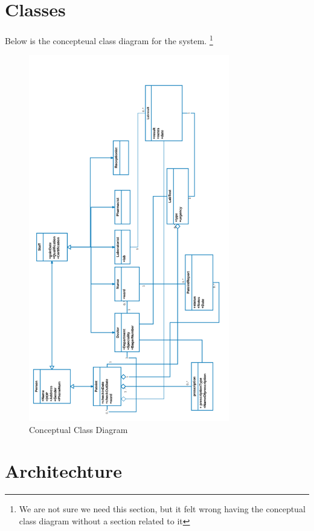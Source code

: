 \documentclass[14pt]{article}
\begin{document}
\section{Classes}
Below is the concepteual class diagram for the system.
\footnote{We are not sure we need this section, but it felt wrong having the conceptual class diagram without a section related
to it}
	\begin{figure}[h!]
		\centering 
		\caption{Conceptual Class Diagram}
		\includegraphics[height=16cm,keepaspectratio]{ConceptualClassDiagram.pdf}
	\end{figure}
\newpage 
\section{Architechture}
\end{document}
